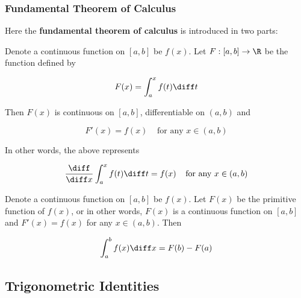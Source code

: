 \subsubsection{Fundamental Theorem of Calculus}
\begin{thm}
  Here the \textbf{fundamental theorem of calculus} is introduced in two parts:

  \begin{alist}
    \item Denote a continuous function on $[a,b]$ be $f(x)$. Let $F:[a,b]\to\R$ be the function defined by

    $$F(x)=\int_{a}^{x}f(t)\diff t$$\s

    Then $F(x)$ is continuous on $[a,b]$, differentiable on $(a,b)$ and

    $$F'(x)=f(x)\;\;\;\;\text{for any }x\in(a,b)$$\s

    In other words, the above represents

    $$\frac{\diff }{\diff  x}\int_{a}^{x}f(t)\diff t=f(x)\;\;\;\;\text{for any }x\in(a,b)$$

    \item Denote a continuous function on $[a,b]$ be $f(x)$. Let $F(x)$ be the primitive function of $f(x)$, or in other words, $F(x)$ is a continuous function on $[a,b]$ and $F'(x)=f(x)$ for any $x\in(a,b)$. Then

    $$\int_{a}^{b}f(x)\diff x=F(b)-F(a)$$
  \end{alist}
\end{thm}

\subsection{Trigonometric Identities}
